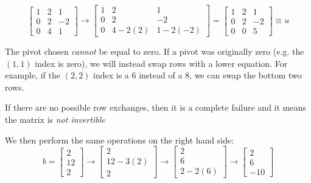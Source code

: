 \documentclass{article}
\begin{document}
    \begin{equation}
        \begin{bmatrix}
            \boxed{1} & 2 & 1\\ 
            0 & \boxed{2} & -2 \\ 
            0 & 4 & 1
        \end{bmatrix}
        \to 
        \begin{bmatrix}
            \boxed{1} & 2 & 1\\ 
            0 & \boxed{2} & -2 \\ 
            0 & 4-2(2) & 1-2(-2) 
        \end{bmatrix}
        =
        \begin{bmatrix}
            \boxed{1} & 2 & 1\\ 
            0 & \boxed{2} & -2 \\ 
            0 & 0 & \boxed{5} 
        \end{bmatrix}\equiv u
        \label{eq:elimination step 3}
    \end{equation}
    \begin{warning}
        The pivot chosen \textit{cannot} be equal to zero. If a pivot was originally zero (e.g. the $(1,1)$ index is zero), we will instead swap rows with a lower equation. For example, if the $(2,2)$ index is a $6$ instead of a $8$, we can swap the bottom two rows.
        \vspace{2mm}

        If there are no possible row exchanges, then it is a complete failure and it means the matrix is \textit{not invertible}
    \end{warning}
    We then perform the same operations on the right hand side:
    \begin{equation}
        b=\begin{bmatrix}
            2\\12\\2 
        \end{bmatrix}
        \to
        \begin{bmatrix}
            2\\12-3(2)\\2
        \end{bmatrix}
        \to 
        \begin{bmatrix}
            2\\6\\2-2(6)
        \end{bmatrix}
        \to 
        \begin{bmatrix}
            2\\6\\-10
        \end{bmatrix} 
        \label{eq:elimination step 4}
    \end{equation}
\end{document}
